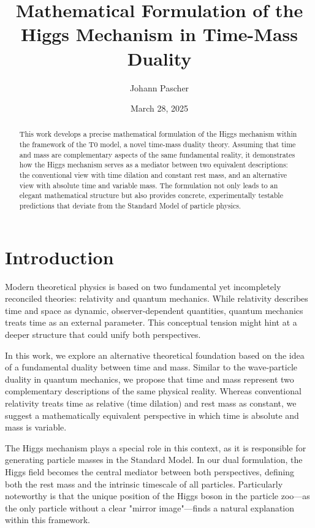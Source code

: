 \documentclass[a4paper,12pt]{article}
\title{Mathematical Formulation of the Higgs Mechanism in Time-Mass Duality}
\author{Johann Pascher}
\date{March 28, 2025}
\begin{document}
	
	\maketitle
	
	\begin{abstract}
		This work develops a precise mathematical formulation of the Higgs mechanism within the framework of the T0 model, a novel time-mass duality theory. Assuming that time and mass are complementary aspects of the same fundamental reality, it demonstrates how the Higgs mechanism serves as a mediator between two equivalent descriptions: the conventional view with time dilation and constant rest mass, and an alternative view with absolute time and variable mass. The formulation not only leads to an elegant mathematical structure but also provides concrete, experimentally testable predictions that deviate from the Standard Model of particle physics.
	\end{abstract}
	
	\tableofcontents
	\newpage
	
	\section{Introduction}
	Modern theoretical physics is based on two fundamental yet incompletely reconciled theories: relativity and quantum mechanics. While relativity describes time and space as dynamic, observer-dependent quantities, quantum mechanics treats time as an external parameter. This conceptual tension might hint at a deeper structure that could unify both perspectives.
	
	In this work, we explore an alternative theoretical foundation based on the idea of a fundamental duality between time and mass. Similar to the wave-particle duality in quantum mechanics, we propose that time and mass represent two complementary descriptions of the same physical reality. Whereas conventional relativity treats time as relative (time dilation) and rest mass as constant, we suggest a mathematically equivalent perspective in which time is absolute and mass is variable.
	
	The Higgs mechanism plays a special role in this context, as it is responsible for generating particle masses in the Standard Model. In our dual formulation, the Higgs field becomes the central mediator between both perspectives, defining both the rest mass and the intrinsic timescale of all particles. Particularly noteworthy is that the unique position of the Higgs boson in the particle zoo—as the only particle without a clear "mirror image"—finds a natural explanation within this framework.
	
\end{document}
